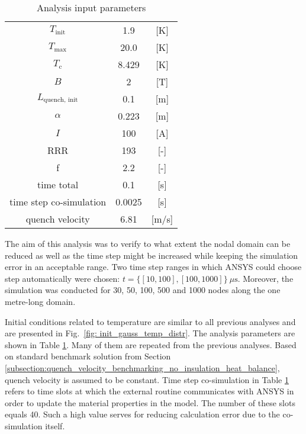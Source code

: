 \begin{table}[h!]
    \caption{Analysis input parameters} 
    \vspace{-1.em} 
    \fontsize{10}{10}
    \selectfont 
    \renewcommand{\arraystretch}{1.5}
    \begin{center}
        \begin{tabular}{ ccc }  
        \hline
        $T_\text{init}$ & 1.9 & [K] \\
        $T_\text{max}$ & 20.0 & [K] \\
        $T_\text{c}$ & 8.429 & [K] \\
        $B$ & 2 & [T] \\
        $L_\text{quench, init}$ & 0.1 & [m] \\ 
        $\alpha$ & 0.223 & [m] \\   
        $I$ & 100 & [A] \\   
        RRR & 193 & [-] \\   
        f & 2.2 & [-] \\   
        time total & 0.1 & [s] \\   
        time step co-simulation & 0.0025 & [s] \\
        quench velocity & 6.81 & [m/s] \\
        \hline 
        \end{tabular}
    \end{center}  
     \label{table: 1d_qv_benchmarking_geometry_parameters_quench_velocity} 
 \end{table}
 
The aim of this analysis was to verify to what extent the nodal domain can be reduced as well as the time step might be increased while keeping the simulation error in an acceptable range. Two time step ranges in which ANSYS could choose step automatically were chosen: $t=\{[10, 100], [100, 1000]\}~\mu \text{s}$. Moreover, the simulation was conducted for 30, 50, 100, 500 and 1000 nodes along the one metre-long domain. 

Initial conditions related to temperature are similar to all previous analyses and are presented in Fig.~\ref{fig: init_gauss_temp_distr}. The analysis parameters are shown in Table \ref{table: 1d_qv_benchmarking_geometry_parameters_quench_velocity}. Many of them are repeated from the previous analyses. Based on standard benchmark solution from Section \ref{subsection:quench_velocity_benchmarking_no_insulation_heat_balance}, quench velocity is assumed to be constant. Time step co-simulation in Table  \ref{table: 1d_qv_benchmarking_geometry_parameters_quench_velocity} refers to time slots at which the external routine communicates with ANSYS in order to update the material properties in the model. The number of these slots equals 40. Such a high value serves for reducing calculation error due to the co-simulation itself.

